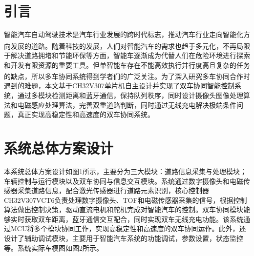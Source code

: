 \documentclass{article}%
\begin{document}
	\begin{multicols}{2}%
		
		
		\section{引言}%
		智能汽车自动驾驶技术是汽车行业发展的跨时代标志，推动汽车行业走向智能化方向发展的道路\textsuperscript{\cite{ref1}}。随着科技的发展，人们对智能汽车的需求也趋于多元化，不再局限于解决道路拥堵和节能环保等方面，智能车逐渐成为代替人们在危险环境进行探索和开发有限资源的重要工具。但单智能车存在不能高效执行并行度高且复杂的任务的缺点，所以多车协同系统得到学者们的广泛关注\textsuperscript{\cite{ref2}}。为了深入研究多车协同合作时遇到的难题，本文基于CH32V307单片机自主设计并实现了双车协同智能控制系统，通过多模块检测距离和蓝牙通信，保持队列秩序，同时设计摄像头图像处理算法和电磁感应处理算法，完善双重道路判断，同时通过无线充电解决极端条件问题，真正实现高稳定性和高速度的双车协同系统。
		
		\section{系统总体方案设计}
		本系统总体方案设计如图1所示，主要分为三大模块：道路信息采集与处理模块；车辆控制与运行模块以及双车协同与信息交互模块。系统通过数字摄像头和电磁传感器采集道路信息，配合激光传感器进行道路元素识别，核心控制器CH32V307VCT6负责处理数字摄像头、TOF和电磁传感器采集的信号，根据控制算法做出控制决策，驱动直流电机和舵机完成对智能汽车的控制。双车协同模块能够实时获取双车距离，蓝牙通信交互配合，同时实现双车无线充电功能。该系统通过MCU将多个模块协同工作，实现高稳定性和高速度的双车协同运作。此外，还设计了辅助调试模块，主要用于智能汽车系统的功能调试，参数设置，状态监控等。系统实际车模图如图2所示。
		

\end{multicols}
\end{document}
